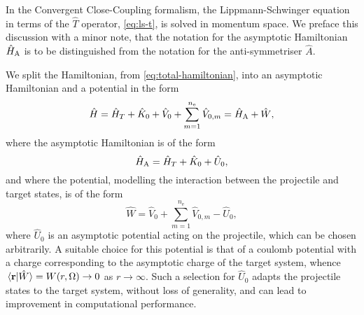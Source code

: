\documentclass[draft]{article}
\begin{document}
In the Convergent Close-Coupling formalism, the Lippmann-Schwinger equation in
terms of the $\hat{T}$ operator, \autoref{eq:ls-t}, is solved in momentum space.
We preface this discussion with a minor note, that the notation for the
asymptotic Hamiltonian $\hat{H}_{\rm{A}}$ is to be distinguished from the
notation for the anti-symmetriser $\hat{A}$.

We split the Hamiltonian, from \autoref{eq:total-hamiltonian}, into an
asymptotic Hamiltonian and a potential in the form
\begin{equation}
  \label{eq:ccc-hamiltonian}
  \hat{H}
  =
  \hat{H}_{T}
  +
  \hat{K}_{0}
  +
  \hat{V}_{0}
  +
  \sum_{m = 1}^{n_{\mathrm{e}}}
  \hat{V}_{0, m}
  =
  \hat{H}_{\rm{A}}
  +
  \hat{W}
  ,
\end{equation}
where the asymptotic Hamiltonian is of the form
\begin{equation}
  \label{eq:ccc-asymptotic-hamiltonian}
  \hat{H}_{\rm{A}}
  =
  \hat{H}_{T}
  +
  \hat{K}_{0}
  +
  \hat{U}_{0}
  ,
\end{equation}
and where the potential, modelling the interaction between the projectile and
target states, is of the form
\begin{equation}
  \label{eq:ccc-potential}
  \hat{W}
  =
  \hat{V}_{0}
  +
  \sum_{m = 1}^{n_{\mathrm{e}}}
  \hat{V}_{0, m}
  -
  \hat{U}_{0}
  ,
\end{equation}
where $\hat{U}_{0}$ is an asymptotic potential acting on the projectile, which
can be chosen arbitrarily.
A suitable choice for this potential is that of a coulomb potential with a
charge corresponding to the asymptotic charge of the target system, whence
$\braket*{\vb{r}}{\hat{W}} = W(r, \Omega) \to 0$ as $r \to \infty$.
Such a selection for $\hat{U}_{0}$ adapts the projectile states to the target
system, without loss of generality, and can lead to improvement in computational
performance.
\end{document}
